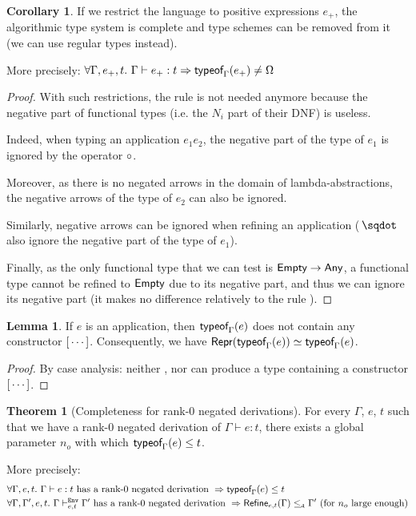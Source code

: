 \documentclass[a4paper]{article}
\theoremstyle{definition}
\newtheorem{theorem}{Theorem}
\newtheorem{lemma}{Lemma}
\newtheorem{corollary}{Corollary}
\begin{document}
  \begin{corollary}\label{app:completeness}
    If we restrict the language to positive expressions $e_+$, the algorithmic type system is complete and type schemes can be removed from it (we can use regular types instead).
    
    More precisely:
    $\forall \Gamma, e_+, t.\ \Gamma \vdash e_+:t \Rightarrow \tyof {e_+} \Gamma \neq \tsempty$
  \end{corollary}

  \begin{proof}
    With such restrictions, the rule  is not needed anymore
    because the negative part of functional types (i.e. the $N_i$ part of their DNF) is useless.

    Indeed, when typing an application $e_1 e_2$, the negative part of the type of $e_1$ 
    is ignored by the operator $\circ$.

    Moreover, as there is no negated arrows in the domain of lambda-abstractions,
    the negative arrows of the type of $e_2$ can also be ignored.

    Similarly, negative arrows can be ignored when refining an application ($\worra {} {}$ also ignore the negative part
    of the type of $e_1$).

    Finally, as the only functional type that we can test is $\textsf{Empty}\to \textsf{Any}$, a functional type
    cannot be refined to $\textsf{Empty}$ due to its negative part, and thus we can ignore its negative part
    (it makes no difference relatively to the rule ).
  \end{proof}

  \begin{lemma}
    If $e$ is an application, then $\textsf{typeof}_{\Gamma}(e)$ does not contain any constructor ${[}\cdots]$.
    Consequently, we have $\textsf{Repr}(\textsf{typeof}_{\Gamma}(e)) \simeq \textsf{typeof}_{\Gamma}(e)$.
  \end{lemma}

  \begin{proof}
    By case analysis: neither ,  nor  can produce a type
    containing a constructor ${[}\cdots]$.
  \end{proof}

  \begin{theorem}[Completeness for rank-0 negated derivations]
    For every $\Gamma$, $e$, $t$ such that we have a rank-0 negated derivation of $\Gamma \vdash e:t$, there exists a global parameter $n_o$
    with which $\textsf{typeof}_{\Gamma}(e) \leq t$.

    More precisely:
    \begin{align*}
      &\forall \Gamma, e, t.\ \Gamma \vdash e:t \text{ has a rank-0 negated derivation } \Rightarrow \textsf{typeof}_{\Gamma}(e) \leq t\\
      &\forall \Gamma, \Gamma', e, t.\ \Gamma \vdash^{\texttt{Env}}_{e,t} \Gamma' \text{ has a rank-0 negated derivation } \Rightarrow \textsf{Refine}_{e,t}(\Gamma) \leq_{\!\scriptscriptstyle\mathcal{A}} \Gamma' \text{ (for $n_o$ large enough)}
    \end{align*}
  \end{theorem}
\end{document}
